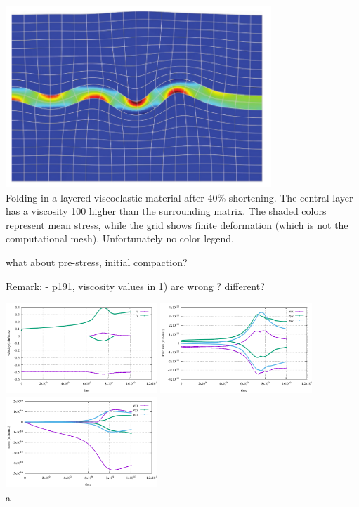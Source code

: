 \begin{center}
\includegraphics[width=10cm]{python_codes/fieldstone_129/images/simpson2}\\
{\captionfont 
Folding in a layered viscoelastic material after 40\% shortening. The central 
layer has a viscosity 100 higher than the surrounding matrix. The shaded colors 
represent mean stress, while the grid shows finite deformation 
(which is not the computational mesh). Unfortunately no color legend.}
\end{center}

what about pre-stress, initial compaction?

Remark:
- p191, viscosity values in 1) are wrong ? different?



\begin{center}
\includegraphics[width=5.7cm]{python_codes/fieldstone_129/results/experiment1/stats_velocity}
\includegraphics[width=5.7cm]{python_codes/fieldstone_129/results/experiment1/stats_strainrate}
\includegraphics[width=5.7cm]{python_codes/fieldstone_129/results/experiment1/stats_stress}\\
{\captionfont a}
\end{center} 


